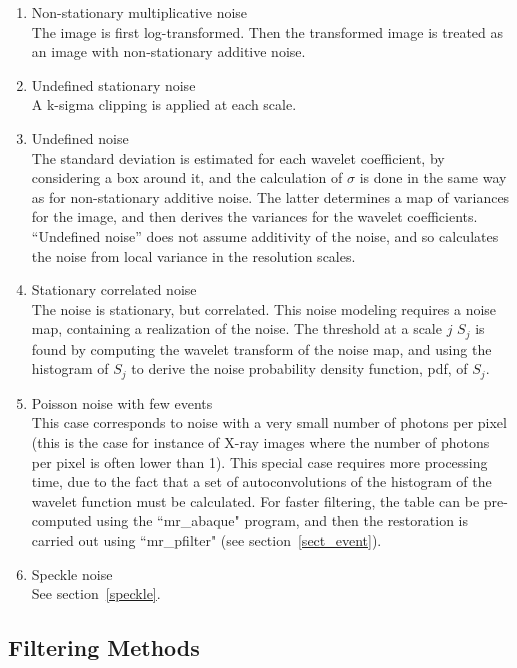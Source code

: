 \begin{itemize}
\begin{enumerate}
\item{Non-stationary multiplicative noise} \\
The image is first log-transformed. Then the transformed image is treated 
as an image with non-stationary additive noise.

\item{Undefined stationary noise}\\
A k-sigma clipping is applied at each scale.

\item{Undefined noise}\\
The standard deviation is estimated for each wavelet coefficient, 
by considering a box around it, and the calculation of $\sigma$ is done 
in the same way as for non-stationary additive noise.  The latter 
determines a map of variances for the image, and then derives the 
variances for the wavelet coefficients.  ``Undefined noise'' does not
assume additivity of the noise, and so calculates the noise from local
variance in the resolution scales.  

\item{Stationary correlated noise} \\
The noise is stationary, but correlated. This noise modeling requires
a noise map, containing a realization of the noise. The threshold 
at a scale $j$ $S_j$ is found   
by computing the wavelet transform of the noise map, and using
the histogram of $S_j$ to derive the noise probability density 
function, pdf, of $S_j$.       
 
\item{Poisson noise with few events} \\
This case corresponds to noise with a very small number of photons  
per pixel (this is the case for instance of X-ray images where the 
number of photons per pixel is often lower than 1).
This special case requires more processing time, due to the fact that 
a set of autoconvolutions of the histogram of the wavelet function must be
calculated. For faster filtering, the table can be pre-computed using 
the ``mr\_abaque" program, and then the restoration 
is carried out using ``mr\_pfilter" 
(see section~\ref{sect_event}). 

\item{Speckle noise} \\
See section~\ref{speckle}.
\end{enumerate}
 
 
 
\subsection{Filtering Methods}

\end{itemize}
